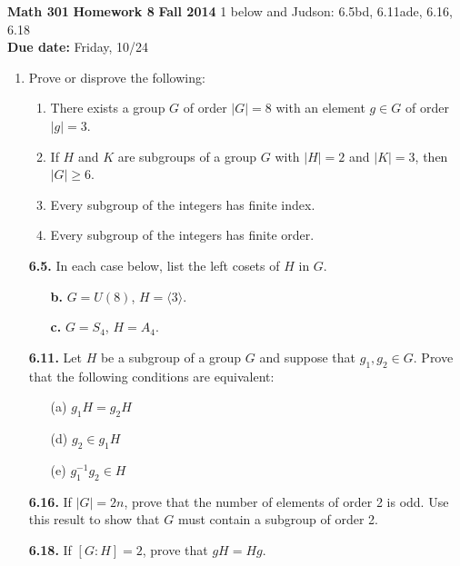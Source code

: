 \documentclass[12pt,reqno]{amsart}
\newcommand{\probskip}{\vskip1cm}
\begin{document}
\thispagestyle{empty}

\noindent \textbf{Math 301} \hskip5cm {\bf Homework 8} \hfill {\bf Fall 2014}
\vskip1cm
 1 below and Judson: 6.5bd, 6.11ade, 6.16, 6.18\\
{\bf Due date:} Friday, 10/24

\bigskip

\begin{enumerate}[{\bf 1.}]

\item
Prove or disprove the following: 
\begin{enumerate}
\item 
There exists a group $G$ of order $|G| = 8$ with an element
$g \in G$ of order $|g|=3$.

\item
If $H$ and $K$ are subgroups of a group $G$ with $|H|=2$ and $|K|=3$, 
  then $|G|\geq 6$.

\item
Every subgroup of the integers has finite index.

\item 
Every subgroup of the integers has finite order.
\end{enumerate}
\probskip

\item[{\bf 6.5.}]
In each case below, list the left cosets of $H$ in $G$.
\begin{enumerate}
\item[{\bf b.}]
$G = U(8)$, $H = \langle 3 \rangle$.
\item[{\bf c.}]
$G = S_4$, $H = A_4$.
\end{enumerate}

\probskip

\item[{\bf 6.11.}] 
Let $H$ be a subgroup of a group $G$ and suppose that $g_1, g_2 \in G$.  Prove
that the following conditions are equivalent: 
\begin{enumerate}
 
\item[(a)]
$g_1 H = g_2 H$
 
\item[(d)]
$g_2 \in g_1 H$
 
\item[(e)]
$g_1^{-1} g_2 \in H$
\end{enumerate}

\probskip
 
\item[{\bf 6.16.}] 
If $|G| = 2n$, prove that the number of elements of order 2 is odd.  Use this
result to show that $G$ must contain a subgroup of order 2. 

\probskip

\item[{\bf 6.18.}] 
If $[G : H] = 2$, prove that $gH = Hg$.

\end{enumerate}
\end{document}
